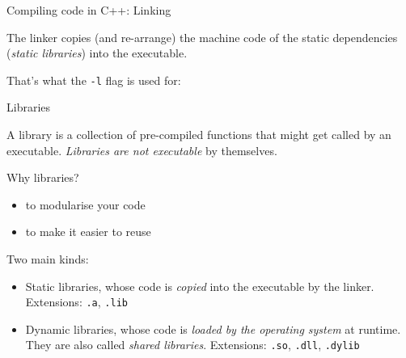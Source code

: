 \documentclass[compress]{beamer}
\begin{document}
\begin{frame}[fragile]{Compiling code in C++: Linking}

The linker copies (and re-arrange) the machine code of the static dependencies
(\emph{static libraries}) into the executable.

That's what the \texttt{-l} flag is used for:


\end{frame}

\begin{frame}{Libraries}

    A library is a collection of pre-compiled functions that might get called by
    an executable. \emph{Libraries are not executable} by themselves.

    \begin{exampleblock}{Why libraries?}
        \begin{itemize}
            \item to modularise your code
            \item to make it easier to reuse
        \end{itemize}
    \end{exampleblock}

    \pause

    Two main kinds:

    \begin{itemize}
        \item Static libraries, whose code is \emph{copied} into the executable
            by the linker. Extensions: \texttt{.a}, \texttt{.lib}
        \item Dynamic libraries, whose code is \emph{loaded by the operating
            system} at runtime. They are also called \emph{shared libraries}.
            Extensions: \texttt{.so}, \texttt{.dll}, \texttt{.dylib}
    \end{itemize}

\end{frame}
\end{document}
